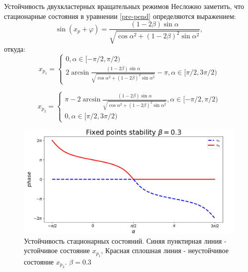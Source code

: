 \begin{chapter}{Устойчивость двухкластерных вращательных режимов}
	Несложно заметить, что стационарные состояния в уравнении \eqref{pre-pend} определяются выражением:
	$$
	\sin{(x_p + \varphi)} = \frac{(1 - 2\beta) \sin{\alpha}}{\sqrt{\cos{\alpha}^2 + (1 - 2\beta)^2\sin{\alpha}^2}},
	$$
	откуда:
	\begin{equation} \label{x1}
		x_{p_1} = \begin{cases}
			0, \alpha \in [-\pi/2, \pi/2) \\
			2\arcsin{\frac{(1 - 2\beta) \sin{\alpha}}{\sqrt{\cos{\alpha}^2 + (1 - 2\beta)^2\sin{\alpha}^2}}} - \pi , \alpha \in [\pi/2, 3\pi/2)
		\end{cases}
	\end{equation}
	
	\begin{equation} \label{x2}
	x_{p_2} = \begin{cases}
		\pi - 2\arcsin{\frac{(1 - 2\beta) \sin{\alpha}}{\sqrt{\cos{\alpha}^2 + (1 - 2\beta)^2\sin{\alpha}^2}}}, \alpha \in [-\pi/2, \pi/2) \\
		0, \alpha \in [\pi/2, 3\pi/2)
		\end{cases}
	\end{equation}
	\begin{figure}[h!]\center		
		\includegraphics[width=1\columnwidth]{pictures/fixed-points.png} 
		\caption{Устойчивость стационарных состояний.
		Синяя пунктирная линия - устойчивое состояние $x_{p_1}$,
		Красная сплошная линия - неустойчивое состояние $x_{p_2}$.
		$\beta = 0.3$}
		\label{fp-2}
	\end{figure}


\end{chapter}
